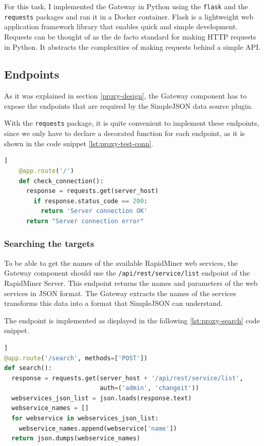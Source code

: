 For this task, I implemented the Gateway in Python using the \texttt{flask}\cite{flask} and the \texttt{requests}\cite{requests} packages and ran it in a Docker container. Flask is a lightweight web application framework library that enables quick and simple development. Requests can be thought of as the de facto standard for making HTTP requests in Python. It abstracts the complexities of making requests behind a simple API.

\subsection{Endpoints}

As it was explained in section \ref{proxy-design}, the Gateway component has to expose the endpoints that are required by the SimpleJSON data source plugin.

With the \texttt{requests} package, it is quite convenient to implement these endpoints, since we only have to declare a decorated function for each endpoint, as it is shown in the code snippet \ref{lst:proxy-test-conn}.

\begin{minipage}{\linewidth}
\begin{lstlisting}[language=Python, caption={Test the connection to the server}, label={lst:proxy-test-conn}]]
	@app.route('/')
	def check_connection():
	  response = requests.get(server_host)
	    if response.status_code == 200:
	      return 'Server connection OK'
	  return "Server connection error"
\end{lstlisting}
\end{minipage}
\subsubsection{Searching the targets}

To be able to get the names of the available RapidMiner web services, the Gateway component should use the \texttt{/api/rest/service/list} endpoint of the RapidMiner Server. This endpoint returns the names and parameters of the web services in JSON format. The Gateway extracts the names of the services transforms this data into a format that SimpleJSON can understand.

The endpoint is implemented as displayed in the following \ref{lst:proxy-search} code snippet. 

\begin{minipage}{\linewidth}
\begin{lstlisting}[language=Python, caption={Get the names of the web services}, label={lst:proxy-search}]]
@app.route('/search', methods=['POST'])
def search():
  response = requests.get(server_host + '/api/rest/service/list',
                          auth=('admin', 'changeit'))
  webservices_json_list = json.loads(response.text)
  webservice_names = []
  for webservice in webservices_json_list:
    webservice_names.append(webservice['name'])
  return json.dumps(webservice_names)
\end{lstlisting}
\end{minipage}
